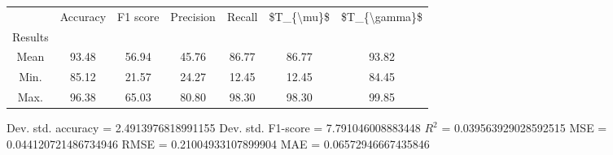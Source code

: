 \begin{tabular}{|c|c|c|c|c|c|c|}
\toprule
{} &  Accuracy &  F1 score &  Precision &  Recall &  \$T\_\{\textbackslash mu\}\$ &  \$T\_\{\textbackslash gamma\}\$ \\
Results &           &           &            &         &            &               \\
\hline
Mean    &     93.48 &     56.94 &      45.76 &   86.77 &      86.77 &         93.82 \\
Min.    &     85.12 &     21.57 &      24.27 &   12.45 &      12.45 &         84.45 \\
Max.    &     96.38 &     65.03 &      80.80 &   98.30 &      98.30 &         99.85 \\
\bottomrule
\end{tabular}

 Dev. std. accuracy = 2.4913976818991155
 Dev. std. F1-score = 7.791046008883448
 $R^2$ = 0.039563929028592515
 MSE = 0.044120721486734946
 RMSE = 0.21004933107899904
 MAE = 0.06572946667435846